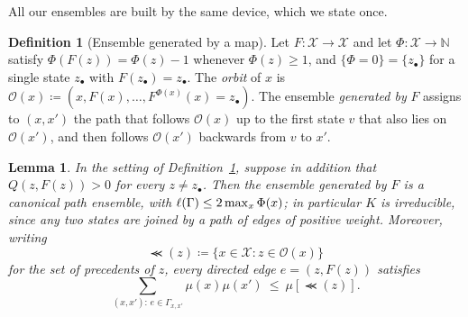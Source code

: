 \documentclass[aos]{imsart}%
\newcommand{\ambientspace}[0]{\mathcal{X}}
\theoremstyle{plain}
\newtheorem{lemma}[theorem]{Lemma}
\theoremstyle{definition}
\newtheorem{definition}[theorem]{Definition}
\begin{document}
    All our ensembles are built by the same device, which we state once.

    \begin{definition}[Ensemble generated by a map]
        \label{def:binary_generated}
        Let $F:\ambientspace\to\ambientspace$ and let $\Phi:\ambientspace\to
        \mathbb{N}$ satisfy $\Phi(F(z))=\Phi(z)-1$ whenever $\Phi(z)\geq1$, and
        $\{\Phi=0\}=\{z_\bullet\}$ for a single state $z_\bullet$ with
        $F(z_\bullet)=z_\bullet$. The \emph{orbit} of $x$ is
        $\mathcal{O}(x)\coloneq(x,F(x),\dots,F^{\Phi(x)}(x)=z_\bullet)$. The
        ensemble \emph{generated by} $F$ assigns to $(x,x')$ the path that
        follows $\mathcal{O}(x)$ up to the first state $v$ that also lies on
        $\mathcal{O}(x')$, and then follows $\mathcal{O}(x')$ backwards from
        $v$ to $x'$.
    \end{definition}

    \begin{lemma}
        \label{lemma:binary_generated}
        In the setting of Definition~\ref{def:binary_generated}, suppose in
        addition that $Q(z,F(z))>0$ for every $z\neq z_\bullet$. Then the
        ensemble generated by $F$ is a canonical path ensemble, with
        $\ell(\Gamma)\leq2\max_x\Phi(x)$; in particular $K$ is irreducible,
        since any two states are joined by a path of edges of positive weight. Moreover, writing
        \begin{equation}
            \label{eq:binary_prec}
            \Prec(z)\coloneq\{x\in\ambientspace: z\in\mathcal{O}(x)\}
        \end{equation}
        for the set of \emph{precedents} of $z$, every directed edge
        $e=(z,F(z))$ satisfies
        \begin{equation}
            \label{eq:binary_prec_bound}
            \sum_{(x,x'):\,e\in\Gamma_{x,x'}}\mu(x)\mu(x')
            \ \leq\ \mu[\Prec(z)] .
        \end{equation}
    \end{lemma}
\end{document}
